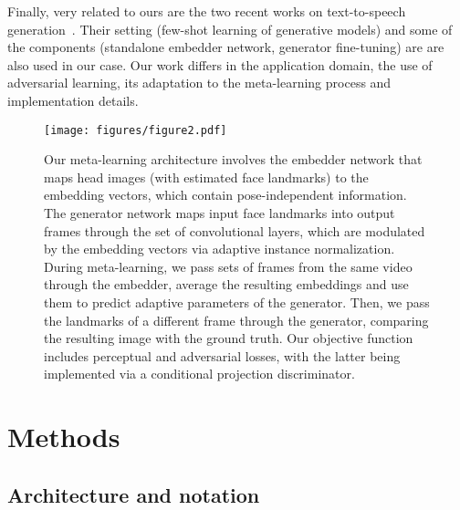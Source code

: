 \documentclass[10pt,twocolumn,letterpaper]{article}
\newcommand{\e}{e}
\begin{document}
Finally, very related to ours are the two recent works on text-to-speech generation~\cite{Arik18,Jia18}. Their setting (few-shot learning of generative models) and some of the components (standalone embedder network, generator fine-tuning) are are also used in our case. Our work differs in the application domain, the use of adversarial learning, its adaptation to the meta-learning process and implementation details. \begin{figure*}
    \centering
    \texttt{[image: figures/figure2.pdf]}\vspace{-2pt}
    \caption{Our meta-learning architecture involves the embedder network that maps head images (with estimated face landmarks) to the embedding vectors, which contain pose-independent information. The generator network maps input face landmarks into output frames through the set of convolutional layers, which are modulated by the embedding vectors via adaptive instance normalization. During meta-learning, we pass sets of frames from the same video through the embedder, average the resulting embeddings and use them to predict adaptive parameters of the generator. Then, we pass the landmarks of a different frame through the generator, comparing the resulting image with the ground truth. Our objective function includes perceptual and adversarial losses, with the latter being implemented via a conditional projection discriminator.\vspace{-4pt}}
    \label{fig:metalearn}
\end{figure*}

\section{Methods}

\newcommand{\floor}[1]{\lfloor #1 \rfloor}
\newcommand{\ceil}[1]{\lceil #1 \rceil}
\renewcommand{\l}{}
\newcommand{\Strut}{\rule[-.4\baselineskip]{0pt}{\baselineskip}}

\def\x{\mathbf{x}}
\def\y{\mathbf{y}}
\def\e{\mathbf{e}}
\def\v{\mathbf{v}}
\def\w{\mathbf{w}}
\def\W{\mathbf{W}}
\def\P{\mathbf{P}}
\def\adv{\mathcal{L}_\text{ADV}}
\def\aadv{\mathcal{L'}_\text{ADV}}
\def\cnt{\mathcal{L}_\text{CNT}}
\def\mtch{\mathcal{L}_\text{MCH}}
\def\fm{\mathcal{L}_\text{FM}}
\def\disc{\mathcal{L}_\text{DSC}}
\def\new{_\text{NEW}}

\subsection{Architecture and notation}
\end{document}
